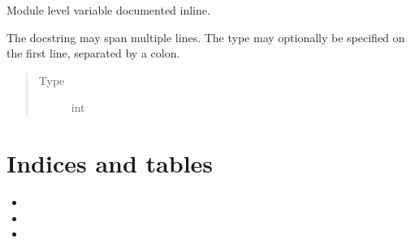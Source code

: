 \documentclass[letterpaper,10pt,english]{sphinxmanual}
\begin{document}
\begin{description}
\begin{fulllineitems}
\end{fulllineitems}


\begin{fulllineitems}
\label{\detokenize{autogen:example_docstring.module_level_variable2}}
Module level variable documented inline.

The docstring may span multiple lines. The type may optionally be specified
on the first line, separated by a colon.
\begin{quote}\begin{description}
\item[{Type}] \leavevmode
int

\end{description}\end{quote}

\end{fulllineitems}


\end{description}


\chapter{Indices and tables}
\label{\detokenize{index:indices-and-tables}}\begin{itemize}
\item {} 

\item {} 

\item {} 

\end{itemize}


\renewcommand{\indexname}{Python Module Index}
\begin{sphinxtheindex}
\let\bigletter\sphinxstyleindexlettergroup
\bigletter{a}
\item\relax{}
\indexspace
\bigletter{e}
\item\relax{}
\indexspace
\bigletter{m}
\item\relax{}
\end{sphinxtheindex}

\renewcommand{\indexname}{Index}
\footnotesize\raggedright\printindex
\end{document}
